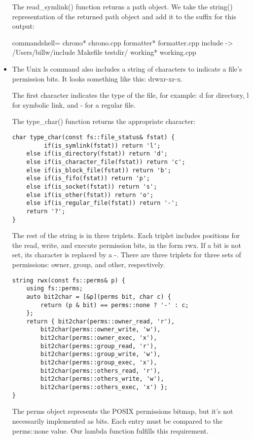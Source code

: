 \begin{itemize}
The read\_symlink() function returns a path object. We take the string() representation of the returned path object and add it to the suffix for this output:

\begin{tcblisting}{commandshell={}}
chrono*
chrono.cpp
formatter*
formatter.cpp
include -> /Users/billw/include
Makefile
testdir/
working*
working.cpp
\end{tcblisting}

\item 
The Unix ls command also includes a string of characters to indicate a file's permission bits. It looks something like this: drwxr-xr-x.

The first character indicates the type of the file, for example: d for directory, l for symbolic link, and - for a regular file.

The type\_char() function returns the appropriate character:

\begin{lstlisting}[style=styleCXX]
char type_char(const fs::file_status& fstat) {
		 if(is_symlink(fstat)) return 'l';
	else if(is_directory(fstat)) return 'd';
	else if(is_character_file(fstat)) return 'c';
	else if(is_block_file(fstat)) return 'b';
	else if(is_fifo(fstat)) return 'p';
	else if(is_socket(fstat)) return 's';
	else if(is_other(fstat)) return 'o';
	else if(is_regular_file(fstat)) return '-';
	return '?';
}
\end{lstlisting}

The rest of the string is in three triplets. Each triplet includes positions for the read, write, and execute permission bits, in the form rwx. If a bit is not set, its character is replaced by a -. There are three triplets for three sets of permissions: owner, group, and other, respectively.

\begin{lstlisting}[style=styleCXX]
string rwx(const fs::perms& p) {
	using fs::perms;
	auto bit2char = [&p](perms bit, char c) {
		return (p & bit) == perms::none ? '-' : c;
	};
	return { bit2char(perms::owner_read, 'r'),
		bit2char(perms::owner_write, 'w'),
		bit2char(perms::owner_exec, 'x'),
		bit2char(perms::group_read, 'r'),
		bit2char(perms::group_write, 'w'),
		bit2char(perms::group_exec, 'x'),
		bit2char(perms::others_read, 'r'),
		bit2char(perms::others_write, 'w'),
		bit2char(perms::others_exec, 'x') };
}
\end{lstlisting}

The perms object represents the POSIX permissions bitmap, but it's not necessarily implemented as bits. Each entry must be compared to the perms::none value.
Our lambda function fulfills this requirement.


\end{itemize}

